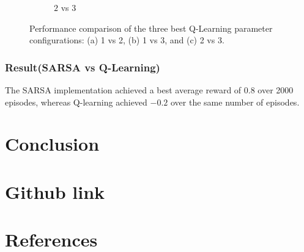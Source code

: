 \documentclass[11pt, a4]{article}
\begin{document}
\begin{figure}[H]
\begin{subfigure}{.7\textwidth}
						\caption{$2$ vs $3$}
						\label{fig:qlearningminigridworld2vs3}
					\end{subfigure}
					\caption{Performance comparison of the three best Q-Learning parameter configurations: (a) 1 vs 2, (b) 1 vs 3, and (c) 2 vs 3.}
					\label{fig:qlearningminigridworld}
				\end{figure}
			\subsubsection{Result(SARSA vs Q-Learning)}
			The SARSA implementation achieved a best average reward of \(0.8\) over 2000 episodes, whereas Q-learning achieved \(-0.2\) over the same number of episodes.
	\section{Conclusion}
	\section{Github link}	
		 \href{https://github.com/RitabrataMandal/RL-DA6400-assignment_1}{}

	\section{References}
\end{document}
